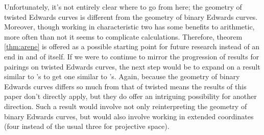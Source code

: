 Unfortunately, it's not entirely clear where to go from here; the geometry of
    twisted Edwards curves is different from the geometry of binary Edwards
    curves.
Moreover, though working in characteristic two has some benefits to arithmetic,
    more often than not it seems to complicate calculations.
Therefore, theorem \ref{thm:arene} is offered as a possible starting point for
    future research instead of an end in and of itself.
If we were to continue to mirror the progression of results for pairings on
    twisted Edwards curves, the next step would be to expand on a result
    similar to \cite{arene2011faster}'s to get one similar to
    \cite{lipairing}'s.
Again, because the geometry of binary Edwards curves differs so much from that
    of twisted means the results of this paper don't directly apply, but they
    do offer an intriguing possibility for another direction.
Such a result would involve not only reinterpreting the geometry of binary
    Edwards curves, but would also involve working in extended coordinates
    (four instead of the usual three for projective space).
